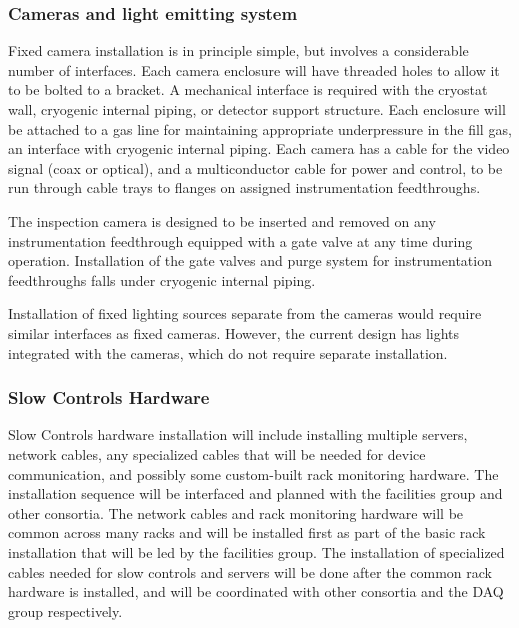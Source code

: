 \subsubsection{Cameras and light emitting system}
\label{sec:fdgen-slow-cryo-install-c}

Fixed camera installation is in principle simple, but involves a
considerable number of interfaces. Each camera enclosure will have
threaded holes to allow it to be bolted to a bracket. A mechanical
interface is required with the cryostat wall, cryogenic internal
piping, or detector support structure. Each enclosure will be attached
to a gas line for maintaining appropriate underpressure in the fill
gas, an interface with cryogenic internal piping. Each camera has a
cable for the video signal (coax or optical), and a multiconductor
cable for power and control, to be run through cable trays to flanges
on assigned instrumentation feedthroughs.

The inspection camera is designed to be inserted and removed on any
instrumentation feedthrough equipped with a gate valve at any time
during operation.  Installation of the gate valves and purge system
for instrumentation feedthroughs falls under cryogenic internal
piping.

Installation of fixed lighting sources separate from the cameras would
require similar interfaces as fixed cameras.  However, the current
design has lights integrated with the cameras, which do not require separate
installation.



\subsubsection{Slow Controls Hardware}
\label{sec:fdgen-slow-cryo-install-sc-hard}

Slow Controls hardware installation will include installing multiple
servers, network cables, any specialized cables that will be needed
for device communication, and possibly some custom-built rack
monitoring hardware. The installation sequence will be interfaced and
planned with the facilities group and other consortia. The network
cables and rack monitoring hardware will be common across many racks
and will be installed first as part of the basic rack installation
that will be led by the facilities group. The installation of
specialized cables needed for slow controls and servers will be done
after the common rack hardware is installed, and will be coordinated
with other consortia and the DAQ group respectively.

